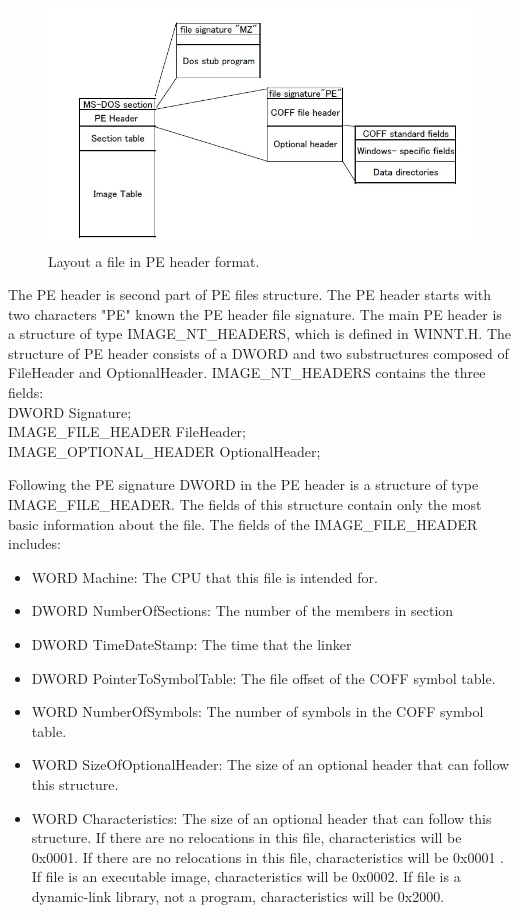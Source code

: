 \begin{figure}[httb]
\centering
\includegraphics[width=1\textwidth]{graph/peheader1.jpg}
\caption{Layout a file in PE header format.}
\label{fig:peheader}
\end{figure}
The PE header is second part of PE files structure. The PE header starts with two characters "PE" known the PE header file signature. The main PE header is a structure of type IMAGE\_NT\_HEADERS, which is defined in WINNT.H. The structure of PE header consists of a DWORD and two substructures composed of FileHeader and OptionalHeader. IMAGE\_NT\_HEADERS contains the three fields:\\
DWORD Signature;\\
IMAGE\_FILE\_HEADER FileHeader;\\
IMAGE\_OPTIONAL\_HEADER OptionalHeader;

Following the PE signature DWORD in the PE header is a structure of type IMAGE\_FILE\_HEADER. The fields of this structure contain only the most basic information about the file. The fields of the IMAGE\_FILE\_HEADER includes:
\begin{itemize}
\item WORD Machine: The CPU that this file is intended for.
\item DWORD NumberOfSections: The number of the members in section
\item DWORD TimeDateStamp: The time that the linker
\item DWORD PointerToSymbolTable: The file offset of the COFF symbol table. 
\item WORD NumberOfSymbols: The number of symbols in the COFF symbol table.
\item WORD SizeOfOptionalHeader: The size of an optional header that can follow this structure.
\item WORD Characteristics: The size of an optional header that can follow this structure. If there are no relocations in this file, characteristics will be 0x0001. If there are no relocations in this file, characteristics will be 0x0001 . If file is an executable image, characteristics will be 0x0002.  If file is a dynamic-link library, not a program, characteristics will be 0x2000.
\end{itemize}



